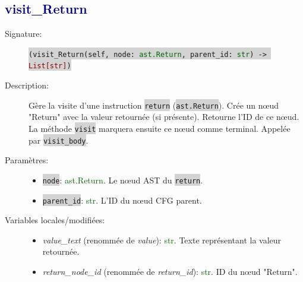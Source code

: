 \documentclass[11pt,a4paper]{article}
\newcommand{\code}[1]{\colorbox{lightgray}{\texttt{\small #1}}}
\newcommand{\var}[1]{\textit{#1}}
\newcommand{\vartype}[1]{\textcolor{darkgreen}{#1}}
\newcommand{\methodname}[1]{\textbf{\textcolor{darkblue}{#1}}}
\newcommand{\param}[1]{\code{#1}}
\newcommand{\rettype}[1]{\textcolor{darkred}{#1}}
\begin{document}
\subsection*{\methodname{visit\_Return}}
\begin{description}
    \item[Signature:] \code{(visit\_Return(self, node: \vartype{ast.Return}, parent\_id: \vartype{str}) -> \rettype{List[str]})}
    \item[Description:] Gère la visite d'une instruction \code{return} (\code{ast.Return}). Crée un nœud "Return" avec la valeur retournée (si présente). Retourne l'ID de ce nœud. La méthode \code{visit} marquera ensuite ce nœud comme terminal. Appelée par \code{visit\_body}.
    \item[Paramètres:]
    \begin{itemize}
        \item \param{node}: \vartype{ast.Return}. Le nœud AST du \code{return}.
        \item \param{parent\_id}: \vartype{str}. L'ID du nœud CFG parent.
    \end{itemize}
    \item[Variables locales/modifiées:]
    \begin{itemize}
        \item \var{value\_text} (renommée de \var{value}): \vartype{str}. Texte représentant la valeur retournée.
        \item \var{return\_node\_id} (renommée de \var{return\_id}): \vartype{str}. ID du nœud "Return".
    \end{itemize}
\end{description}
\end{document}
